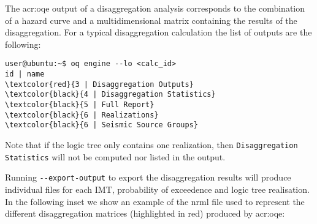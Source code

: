 The \glsdesc{acr:oqe} output of a disaggregation analysis corresponds to the
combination of a hazard curve and a multidimensional matrix containing the
results of the disaggregation. For a typical disaggregation calculation the
list of outputs are the following:

\begin{Verbatim}[frame=single, commandchars=\\\{\}, fontsize=\small]
user@ubuntu:~$ oq engine --lo <calc_id>
id | name
\textcolor{red}{3 | Disaggregation Outputs}
\textcolor{black}{4 | Disaggregation Statistics}
\textcolor{black}{5 | Full Report}
\textcolor{black}{6 | Realizations}
\textcolor{black}{6 | Seismic Source Groups}
\end{Verbatim}
%

Note that if the logic tree only contains one realization, then
\texttt{Disaggregation Statistics} will not be computed nor listed in the output.

Running \texttt{-{}-export-output} to export the disaggregation results will produce individual files for each IMT, probability of exceedence and logic tree realisation. In the following inset we show an example of the nrml file used to represent the different disaggregation matrices (highlighted in red) produced by
\gls{acr:oqe}:

